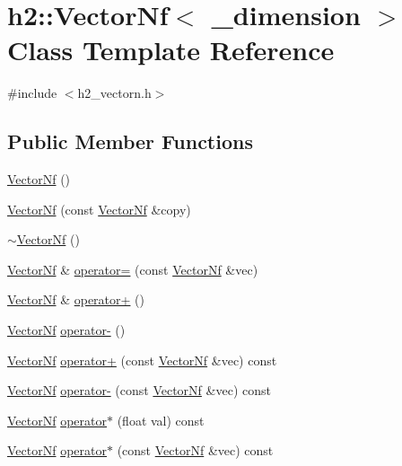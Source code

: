 \hypertarget{classh2_1_1_vector_nf}{\section{h2\-:\-:Vector\-Nf$<$ \-\_\-dimension $>$ Class Template Reference}
\label{classh2_1_1_vector_nf}
}


{\ttfamily \#include $<$h2\-\_\-vectorn.\-h$>$}

\subsection*{Public Member Functions}
\begin{DoxyCompactItemize}
\item 
\hyperlink{classh2_1_1_vector_nf_a28c04ea428884ee4b3fad8d7fd10b530}{Vector\-Nf} ()
\item 
\hyperlink{classh2_1_1_vector_nf_afa3fd2c4a900b66d746c5725a18d9797}{Vector\-Nf} (const \hyperlink{classh2_1_1_vector_nf}{Vector\-Nf} \&copy)
\item 
\hyperlink{classh2_1_1_vector_nf_ae8a4d05cbc1b40dea9d16f7ba6c88d33}{$\sim$\-Vector\-Nf} ()
\item 
\hyperlink{classh2_1_1_vector_nf}{Vector\-Nf} \& \hyperlink{classh2_1_1_vector_nf_a31dd602dc25ff440bdcf77ac5fedfff0}{operator=} (const \hyperlink{classh2_1_1_vector_nf}{Vector\-Nf} \&vec)
\item 
\hyperlink{classh2_1_1_vector_nf}{Vector\-Nf} \& \hyperlink{classh2_1_1_vector_nf_a3ab0d888f54167c35359ee54b2bde0bf}{operator+} ()
\item 
\hyperlink{classh2_1_1_vector_nf}{Vector\-Nf} \hyperlink{classh2_1_1_vector_nf_aac4d9f111e03e950f9b86e819001d43c}{operator-\/} ()
\item 
\hyperlink{classh2_1_1_vector_nf}{Vector\-Nf} \hyperlink{classh2_1_1_vector_nf_a66e110b7414f773fb907401c6ec0f309}{operator+} (const \hyperlink{classh2_1_1_vector_nf}{Vector\-Nf} \&vec) const 
\item 
\hyperlink{classh2_1_1_vector_nf}{Vector\-Nf} \hyperlink{classh2_1_1_vector_nf_a77193ca5f2255993e9422629e11cc659}{operator-\/} (const \hyperlink{classh2_1_1_vector_nf}{Vector\-Nf} \&vec) const 
\item 
\hyperlink{classh2_1_1_vector_nf}{Vector\-Nf} \hyperlink{classh2_1_1_vector_nf_a45ac2fc2a7785f3f5df75b54d326fa02}{operator$\ast$} (float val) const 
\item 
\hyperlink{classh2_1_1_vector_nf}{Vector\-Nf} \hyperlink{classh2_1_1_vector_nf_a18f81ed1db56b835b5617abf77fcf10c}{operator$\ast$} (const \hyperlink{classh2_1_1_vector_nf}{Vector\-Nf} \&vec) const 

\end{DoxyCompactItemize}
